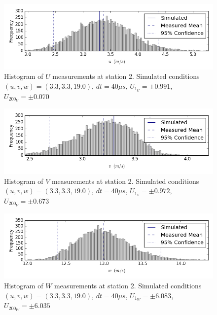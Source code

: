\begin{figure}[H]
\centering
\includegraphics[width=6in]{figs/Ely_May28th02002/uncertainty_Ely_May28th02002_U}
\caption{Histogram of $U$ measurements at station 2. Simulated conditions $(u,v,w)=(3.3, 3.3, 19.0)$, $dt=40 \mu s$, $U_{1_{U}}=\pm 0.991$, $U_{200_{U}}=\pm 0.070$}
\label{fig:uncertainty_Ely_May28th02002_U}
\end{figure}


\begin{figure}[H]
\centering
\includegraphics[width=6in]{figs/Ely_May28th02002/uncertainty_Ely_May28th02002_V}
\caption{Histogram of $V$ measurements at station 2. Simulated conditions $(u,v,w)=(3.3, 3.3, 19.0)$, $dt=40 \mu s$, $U_{1_{V}}=\pm 0.972$, $U_{200_{V}}=\pm 0.673$}
\label{fig:uncertainty_Ely_May28th02002_V}
\end{figure}


\begin{figure}[H]
\centering
\includegraphics[width=6in]{figs/Ely_May28th02002/uncertainty_Ely_May28th02002_W}
\caption{Histogram of $W$ measurements at station 2. Simulated conditions $(u,v,w)=(3.3, 3.3, 19.0)$, $dt=40 \mu s$, $U_{1_{W}}=\pm 6.083$, $U_{200_{W}}=\pm 6.035$}
\label{fig:uncertainty_Ely_May28th02002_W}
\end{figure}


